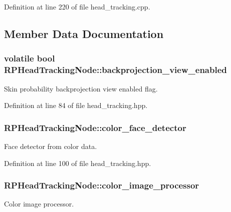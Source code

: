 \-Definition at line 220 of file head\-\_\-tracking.\-cpp.



\subsection{\-Member \-Data \-Documentation}
\hypertarget{class_r_p_head_tracking_node_ac8289f71606ec26d687bec74d981ff89}{
\subsubsection[{backprojection\-\_\-view\-\_\-enabled}]{\setlength{\rightskip}{0pt plus 5cm}volatile bool {\bf \-R\-P\-Head\-Tracking\-Node\-::backprojection\-\_\-view\-\_\-enabled}}}\label{class_r_p_head_tracking_node_ac8289f71606ec26d687bec74d981ff89}
\-Skin probability backprojection view enabled flag. 

\-Definition at line 84 of file head\-\_\-tracking.\-hpp.

\hypertarget{class_r_p_head_tracking_node_a4e92e10df6588934cbebd6011a68aada}{
\subsubsection[{color\-\_\-face\-\_\-detector}]{ {\bf \-R\-P\-Head\-Tracking\-Node\-::color\-\_\-face\-\_\-detector}}}\label{class_r_p_head_tracking_node_a4e92e10df6588934cbebd6011a68aada}
\-Face detector from color data. 

\-Definition at line 100 of file head\-\_\-tracking.\-hpp.

\hypertarget{class_r_p_head_tracking_node_a74e4f88862813f99d7de88bc8b563efb}{
\subsubsection[{color\-\_\-image\-\_\-processor}]{ {\bf \-R\-P\-Head\-Tracking\-Node\-::color\-\_\-image\-\_\-processor}}}\label{class_r_p_head_tracking_node_a74e4f88862813f99d7de88bc8b563efb}
\-Color image processor. 

